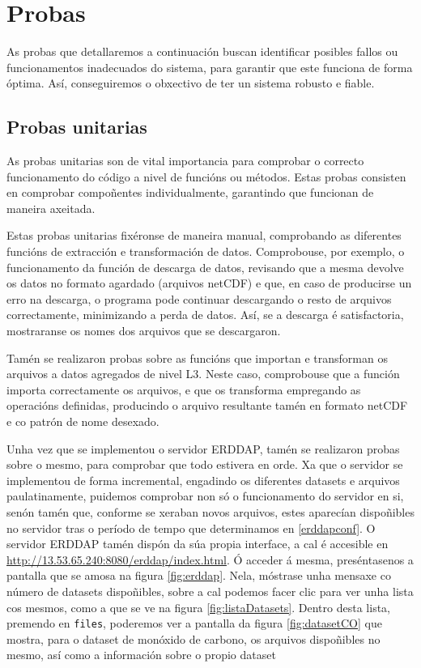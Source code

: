 \chapter{Probas}

As probas que detallaremos a continuación buscan identificar posibles fallos ou funcionamentos inadecuados do sistema, para garantir que este funciona de forma óptima. Así, conseguiremos o
obxectivo de ter un sistema robusto e fiable.

\section{Probas unitarias}\label{unitarias}
As probas unitarias son de vital importancia para comprobar o correcto funcionamento do código a nivel de funcións ou métodos. Estas probas consisten en comprobar compoñentes individualmente,
garantindo que funcionan de maneira axeitada.

Estas probas unitarias fixéronse de maneira manual, comprobando as diferentes funcións de extracción e transformación de datos. Comprobouse, por exemplo, o funcionamento da función de descarga de
datos, revisando que a mesma devolve os datos no formato agardado (arquivos netCDF) e que, en caso de producirse un erro na descarga, o programa pode continuar descargando o resto de arquivos
correctamente, minimizando a perda de datos. Así, se a descarga é satisfactoria, mostraranse os nomes dos arquivos que se descargaron.

Tamén se realizaron probas sobre as funcións que importan e transforman os arquivos a datos agregados de nivel L3. Neste caso, comprobouse que a función importa correctamente os arquivos, e que os
transforma empregando as operacións definidas, producindo o arquivo resultante tamén en formato netCDF e co patrón de nome desexado.

Unha vez que se implementou o servidor ERDDAP, tamén se realizaron probas sobre o mesmo, para comprobar que todo estivera en orde. Xa que o servidor se implementou de forma incremental, engadindo
os diferentes datasets e arquivos paulatinamente, puidemos comprobar non só o funcionamento do servidor en si, senón tamén que, conforme se xeraban novos arquivos, estes aparecían dispoñibles no
servidor tras o período de tempo que determinamos en \ref{erddapconf}. O servidor ERDDAP tamén dispón da súa propia interface, a cal é accesible en \url{http://13.53.65.240:8080/erddap/index.html}.
Ó acceder á mesma, preséntasenos a pantalla que se amosa na figura \ref{fig:erddap}. Nela, móstrase unha mensaxe co número de datasets dispoñibles, sobre a cal podemos facer clic para ver unha lista
cos mesmos, como a que se ve na figura \ref{fig:listaDatasets}. Dentro desta lista, premendo en \texttt{files}, poderemos ver a pantalla da figura \ref{fig:datasetCO} que mostra, para o dataset de
monóxido de carbono, os arquivos dispoñibles no mesmo, así como a información sobre o propio dataset

